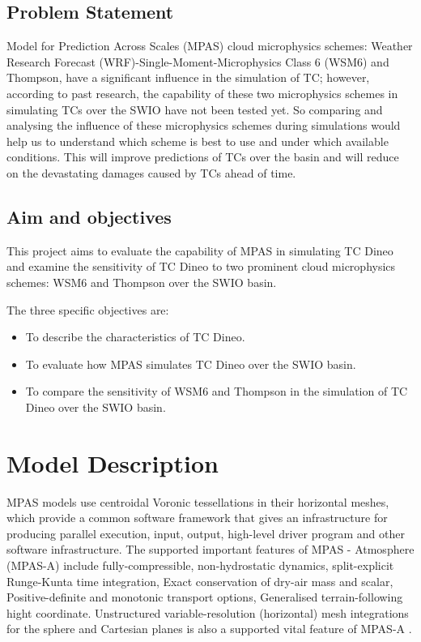 \documentclass[9pt,a4paper]{article}
\begin{document}
	
	
	\subsection{Problem Statement}
	Model for Prediction Across Scales (MPAS) cloud microphysics schemes: Weather Research Forecast (WRF)-Single-Moment-Microphysics Class 6 (WSM6) and Thompson, have a significant influence in the simulation of TC; however, according to past research, the capability of these two microphysics schemes in simulating TCs over the SWIO have not been tested yet. So comparing and analysing the influence of these microphysics schemes during simulations would help us to understand which scheme is best to use and under which available conditions. This will improve predictions of TCs over the basin and will reduce on the devastating damages caused by TCs ahead of time. 
	
	
	\subsection{Aim and objectives}
	This project aims to evaluate the capability of MPAS in simulating TC Dineo and examine the sensitivity of TC Dineo to two  prominent  cloud microphysics schemes: WSM6 and Thompson over the SWIO basin.
	
	The three specific objectives are:
	\begin{itemize}
		\item To describe the characteristics of TC Dineo.
		
		\item To evaluate how MPAS simulates TC Dineo over the SWIO basin.
		
		\item To compare the sensitivity of WSM6 and Thompson in the simulation of TC Dineo over the SWIO basin.
		
	\end{itemize}

		\section{Model Description}
		MPAS models use centroidal Voronic tessellations in their horizontal meshes, which provide a common software framework that gives an infrastructure for producing parallel execution, input, output, high-level driver program and other software infrastructure.  The supported important features of MPAS - Atmosphere (MPAS-A) include fully-compressible, non-hydrostatic dynamics, split-explicit Runge-Kunta time integration, Exact conservation of dry-air mass and scalar, Positive-definite and monotonic transport options, Generalised terrain-following hight coordinate. Unstructured variable-resolution (horizontal) mesh integrations for the sphere and Cartesian planes is also a supported vital feature of MPAS-A \citep{n.d.}. 
		
\end{document}
